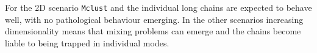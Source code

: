 \documentclass{bioinfo}
\begin{document}
For the 2D scenario \texttt{Mclust} and the individual long chains are expected to behave well, with no pathological behaviour emerging. In the other scenarios increasing dimensionality means that mixing problems can emerge and the chains become liable to being trapped in individual modes. 

%
%
\end{document}
